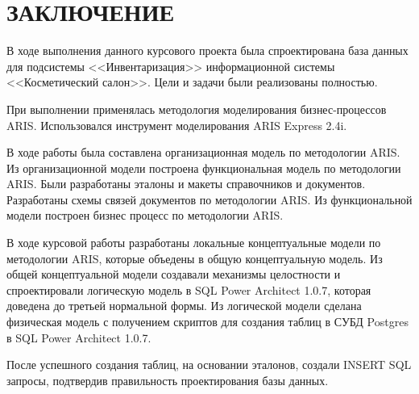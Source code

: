 {}
\section*{ЗАКЛЮЧЕНИЕ}

В ходе выполнения данного курсового проекта была спроектирована база данных
для подсистемы <<Инвентаризация>> информационной системы <<Косметический салон>>.
Цели и задачи были реализованы полностью.

При выполнении применялась методология моделирования бизнес-процессов ARIS.
Использовался инструмент моделирования ARIS Express 2.4i.

В ходе работы была составлена организационная модель по методологии ARIS.
Из организационной модели построена функциональная модель по методологии ARIS.
Были разработаны эталоны и макеты справочников и документов.
Разработаны схемы связей документов по методологии ARIS.
Из функциональной модели построен бизнес процесс по методологии ARIS.

В ходе курсовой работы разработаны локальные концептуальные модели по методологии ARIS,
которые объедены в общую концептуальную модель. 
Из общей концептуальной модели создавали механизмы целостности и спроектировали
логическую модель в SQL Power Architect 1.0.7, которая доведена до третьей нормальной формы.
Из логической модели сделана физическая модель с получением скриптов для создания
таблиц в СУБД Postgres в SQL Power Architect 1.0.7.

После успешного создания таблиц, на основании эталонов, создали INSERT SQL запросы,
подтвердив правильность проектирования базы данных.

\newpage
